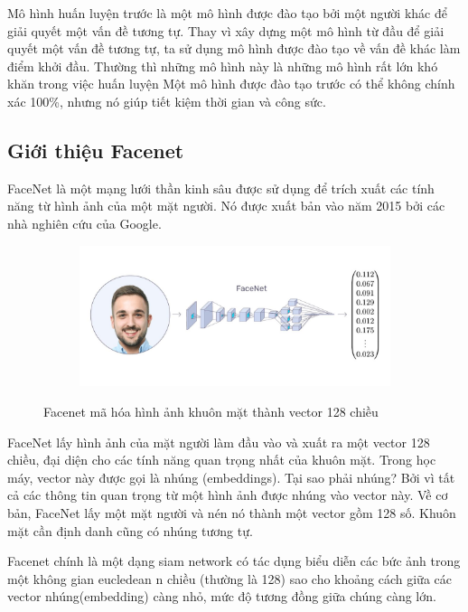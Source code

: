 Mô hình huấn luyện trước là một mô hình được đào tạo bởi một người khác để giải quyết
một vấn đề tương tự. Thay vì xây dựng một mô hình từ đầu để giải quyết một vấn đề tương tự,
ta sử dụng mô hình được đào tạo về vấn đề khác làm điểm khởi đầu.
Thường thì những mô hình này là những mô hình rất lớn khó khăn trong việc huấn luyện
Một mô hình được đào tạo trước có thể không chính xác 100\%,
nhưng nó giúp tiết kiệm thời gian và công sức.

\subsection{Giới thiệu Facenet}

FaceNet là một mạng lưới thần kinh sâu được sử dụng để trích xuất các tính năng từ
hình ảnh của một mặt người. Nó được xuất bản vào năm 2015 bởi các nhà nghiên cứu của Google.

\begin{figure}
    \begin{subfigure}{1.\textwidth}
        \begin{center}
            \includegraphics[width=1.\linewidth]{Chapters/items/chap2_17.jpg}
        \end{center}
        \label{fig:chap2_17}
    \end{subfigure}
    \caption{Facenet mã hóa hình ảnh khuôn mặt thành vector 128 chiều}
\end{figure}

FaceNet lấy hình ảnh của mặt người làm đầu vào và xuất ra một vector 128 chiều,
đại diện cho các tính năng quan trọng nhất của khuôn mặt.
Trong học máy, vector này được gọi là nhúng (embeddings).
Tại sao phải nhúng? Bởi vì tất cả các thông tin quan trọng từ một hình ảnh được nhúng
vào vector này. Về cơ bản, FaceNet lấy một mặt người và nén nó thành một vector gồm 128 số.
Khuôn mặt cần định danh cũng có nhúng tương tự.

Facenet chính là một dạng siam network có tác dụng biểu diễn các bức ảnh trong một không
gian eucledean n chiều (thường là 128) sao cho khoảng cách giữa các vector nhúng(embedding)
càng nhỏ, mức độ tương đồng giữa chúng càng lớn.

